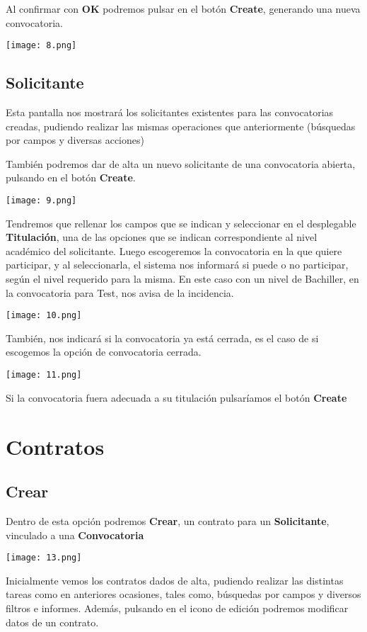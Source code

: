 Al confirmar con \textbf{OK} podremos pulsar en el botón
\textbf{Create}, generando una nueva convocatoria.

\texttt{[image: 8.png]}

\subsection{Solicitante}\label{solicitante}

Esta pantalla nos mostrará los solicitantes existentes para las
convocatorias creadas, pudiendo realizar las mismas operaciones que
anteriormente (búsquedas por campos y diversas acciones)

También podremos dar de alta un nuevo solicitante de una convocatoria
abierta, pulsando en el botón \textbf{Create}.

\texttt{[image: 9.png]}


Tendremos que rellenar los campos que se indican y seleccionar en el desplegable \textbf{Titulación}, una de las opciones que se indican correspondiente al nivel académico del solicitante.
Luego escogeremos la convocatoria en la que quiere participar, y al
seleccionarla, el sistema nos informará si puede o no participar, según el nivel requerido para la misma. En este caso con un nivel de Bachiller, en la convocatoria para Test, nos avisa de la incidencia.

\texttt{[image: 10.png]}

También, nos indicará si la convocatoria ya está cerrada, es el caso de si escogemos la opción de convocatoria cerrada.

\texttt{[image: 11.png]}

Si la convocatoria fuera adecuada a su titulación pulsaríamos el botón \textbf{Create}

\section{Contratos}\label{contratos}

\subsection{Crear}\label{crear}

Dentro de esta opción podremos \textbf{Crear}, un contrato para un
\textbf{Solicitante}, vinculado a una \textbf{Convocatoria}

\texttt{[image: 13.png]}

Inicialmente vemos los contratos dados de alta, pudiendo realizar las distintas tareas como en anteriores ocasiones, tales como, búsquedas por campos y diversos filtros e informes. Además, pulsando en el icono de edición podremos modificar datos de un contrato.

